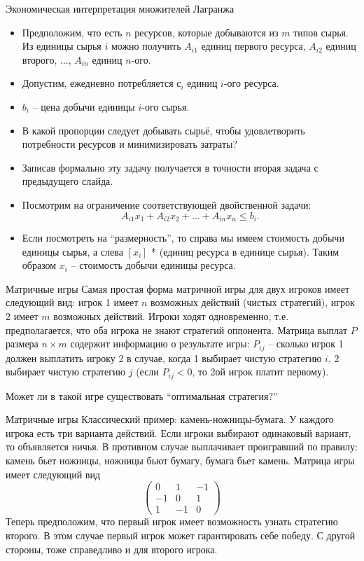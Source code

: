 \documentclass[10pt]{beamer}
\begin{document}
\begin{frame}{Экономическая интерпретация множителей Лагранжа}
\begin{itemize}
\item
Предположим, что есть $n$ ресурсов, которые добываются из $m$ типов сырья. Из единицы сырья  $i$ можно получить $A_{i1}$ единиц первого ресурса, $A_{i2}$ единиц второго, $\ldots$, $A_{in}$ единиц $n$-ого.
\item Допустим, ежедневно потребляется $с_i$ единиц $i$-ого ресурса.
\item $b_i$ -- цена добычи единицы $i$-ого сырья.
\item В какой пропорции следует добывать сырьё, чтобы удовлетворить потребности ресурсов и минимизировать затраты?
\item Записав формально эту задачу получается в точности вторая задача с предыдущего слайда.
\item Посмотрим на ограничение соответствующей двойственной задачи:
$$
A_{i1}x_1+A_{i2}x_2+\ldots+A_{in}x_n\leq b_i.
$$
\item Если посмотреть на ``размерность'', то справа мы имеем стоимость добычи единицы сырья, а слева $[x_i]$ * (единиц ресурса в единице сырья). Таким образом $x_i$ -- стоимость добычи единицы ресурса.
\end{itemize}
\end{frame}

\begin{frame}{Матричные игры}
Самая простая форма матричной игры для двух игроков имеет следующий вид: игрок 1 имеет $n$ возможных действий (чистых стратегий), игрок 2 имеет $m$ возможных действий. Игроки ходят одновременно, т.е. предполагается, что оба игрока не знают стратегий оппонента. Матрица выплат $P$ размера $n\times m$ содержит информацию о результате игры: $P_{ij}$ -- сколько игрок 1 должен выплатить игроку 2 в случае, когда 1 выбирает чистую стратегию $i$, 2 выбирает чистую стратегию $j$ (если $P_{ij}<0$, то 2ой игрок платит первому). 
\vspace{2em}

Может ли в такой игре существовать ``оптимальная стратегия?''  
\end{frame}

\begin{frame}{Матричные игры}
Классический пример: камень-ножницы-бумага. У каждого игрока есть три варианта действий. Если игроки выбирают одинаковый вариант, то объявляется ничья. В противном случае выплачивает проигравший по правилу: камень бьет ножницы, ножницы бьют бумагу, бумага бьет камень. Матрица игры имеет следующий вид
$$
\left(
\begin{array}{lll}
0 & 1 & -1 \\
-1 & 0 & 1 \\
1 & -1 & 0
\end{array}
\right)
$$
Теперь предположим, что первый игрок имеет возможность узнать стратегию второго. В этом случае первый игрок может гарантировать себе победу. С другой стороны, тоже справедливо и для второго игрока.
\end{frame}
\end{document}
